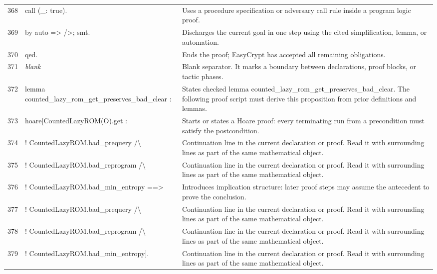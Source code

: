 \documentclass[10pt]{article}
\begin{document}
\begin{longtable}{r L{0.53\textwidth} L{0.37\textwidth}}
368 & {\ttfamily\scriptsize call (\_: true).} & Uses a procedure specification or adversary call rule inside a program logic proof. \\
369 & {\ttfamily\scriptsize by auto => />; smt.} & Discharges the current goal in one step using the cited simplification, lemma, or automation. \\
370 & {\ttfamily\scriptsize qed.} & Ends the proof; EasyCrypt has accepted all remaining obligations. \\
371 & {\ttfamily\scriptsize \emph{blank}} & Blank separator.  It marks a boundary between declarations, proof blocks, or tactic phases. \\
372 & {\ttfamily\scriptsize lemma counted\_lazy\_rom\_get\_preserves\_bad\_clear :} & States checked lemma counted\_lazy\_rom\_get\_preserves\_bad\_clear.  The following proof script must derive this proposition from prior definitions and lemmas. \\
373 & {\ttfamily\scriptsize   hoare[CountedLazyROM(O).get :} & Starts or states a Hoare proof: every terminating run from a precondition must satisfy the postcondition. \\
374 & {\ttfamily\scriptsize     ! CountedLazyROM.bad\_prequery /\textbackslash{}} & Continuation line in the current declaration or proof.  Read it with surrounding lines as part of the same mathematical object. \\
375 & {\ttfamily\scriptsize     ! CountedLazyROM.bad\_reprogram /\textbackslash{}} & Continuation line in the current declaration or proof.  Read it with surrounding lines as part of the same mathematical object. \\
376 & {\ttfamily\scriptsize     ! CountedLazyROM.bad\_min\_entropy ==>} & Introduces implication structure: later proof steps may assume the antecedent to prove the conclusion. \\
377 & {\ttfamily\scriptsize     ! CountedLazyROM.bad\_prequery /\textbackslash{}} & Continuation line in the current declaration or proof.  Read it with surrounding lines as part of the same mathematical object. \\
378 & {\ttfamily\scriptsize     ! CountedLazyROM.bad\_reprogram /\textbackslash{}} & Continuation line in the current declaration or proof.  Read it with surrounding lines as part of the same mathematical object. \\
379 & {\ttfamily\scriptsize     ! CountedLazyROM.bad\_min\_entropy].} & Continuation line in the current declaration or proof.  Read it with surrounding lines as part of the same mathematical object. \\

\end{longtable}
\end{document}
